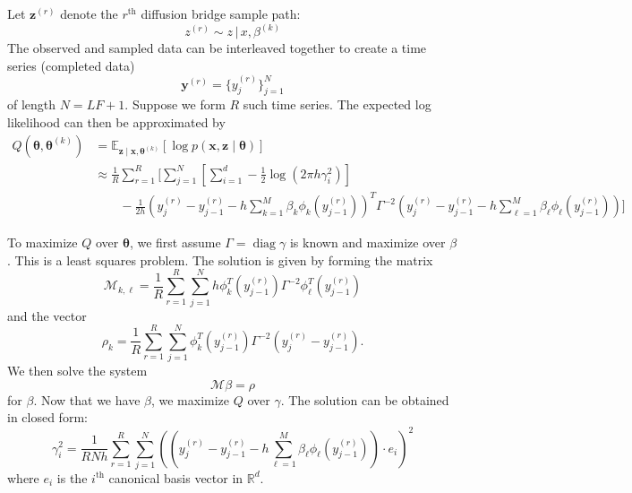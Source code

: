 \documentclass[12pt]{article}
\newcommand{\btheta}{\ensuremath{\boldsymbol{\theta}}}
\newcommand{\opdiag}{\ensuremath{\operatorname{diag}}}
\newcommand{\bx}{\ensuremath{\mathbf{x}}}
\newcommand{\bz}{\ensuremath{\mathbf{z}}}
\begin{document}
Let $\mathbf{z}^{(r)}$ denote the $r^\text{th}$ diffusion bridge sample path:
\begin{equation}
z^{(r)} \sim z \, | \, x, \beta^{(k)}
\end{equation}
The observed and sampled data can be interleaved together to create a time series (completed data)
$$
\mathbf{y}^{(r)} = \{y_j^{(r)}\}_{j=1}^N
$$
of length $N = LF + 1$.  Suppose we form $R$ such time series.  The expected log likelihood can then be approximated by
\begin{align*}
Q(\btheta, \btheta^{(k)}) &= \mathbb{E}_{\bz \mid \bx, \btheta^{(k)}} [\log p(\bx, \bz \mid \btheta)] \\
 &\approx \frac{1}{R} \sum_{r=1}^R \biggl[ \sum_{j=1}^N \left[ \sum_{i=1}^d -\frac{1}{2} \log (2 \pi h \gamma_i^2) \right] \\
 &\qquad -\frac{1}{2h} (y_j^{(r)} - y_{j-1}^{(r)} - h \sum_{k=1}^M \beta_k \phi_k(y_{j-1}^{(r)}))^T \Gamma^{-2} (y_j^{(r)} - y_{j-1}^{(r)} - h \sum_{\ell=1}^M \beta_\ell \phi_\ell(y_{j-1}^{(r)}) ) \biggr] 
\end{align*}

To maximize $Q$ over $\btheta$, we first assume $\Gamma = \opdiag \gamma$ is known and maximize over $\beta$.  This is a least squares problem.  The solution is given by forming the matrix
$$
\mathcal{M}_{k,\ell} = \frac{1}{R} \sum_{r=1}^{R} \sum_{j=1}^N h \phi_k^T (y_{j-1}^{(r)}) \Gamma^{-2} \phi_\ell^T (y_{j-1}^{(r)})
$$
and the vector
$$
\rho_k = \frac{1}{R} \sum_{r=1}^{R} \sum_{j=1}^N \phi_k^T (y_{j-1}^{(r)}) \Gamma^{-2} (y_j^{(r)} - y_{j-1}^{(r)}).
$$
We then solve the system
$$
\mathcal{M} \beta = \rho
$$
for $\beta$.  Now that we have $\beta$, we maximize $Q$ over $\gamma$.  The solution can be obtained in closed form:
$$
\gamma_i^2 = \frac{1}{R N h} \sum_{r=1}^{R} \sum_{j=1}^N (( y_j^{(r)} - y_{j-1}^{(r)} - h \sum_{\ell=1}^M \beta_\ell \phi_\ell (y_{j-1}^{(r)}) ) \cdot e_i )^2
$$
where $e_i$ is the $i^\text{th}$ canonical basis vector in $\mathbb{R}^d$.
\end{document}
